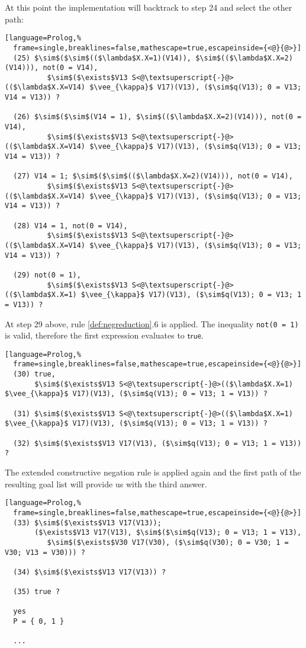 \documentclass[inscr,ack,preface]{dithesis}
\theoremstyle{definition}
\newcommand{\msf}[1]{$\mathsf{#1}$}
\begin{document}
At this point the implementation will backtrack to step 24 and select the other path:
\begin{lstlisting}[language=Prolog,%
  frame=single,breaklines=false,mathescape=true,escapeinside={<@}{@>}]
  (25) $\sim$($\sim$(($\lambda$X.X=1)(V14)), $\sim$(($\lambda$X.X=2)(V14))), not(0 = V14),
          $\sim$($\exists$V13 S<@\textsuperscript{-}@>(($\lambda$X.X=V14) $\vee_{\kappa}$ V17)(V13), ($\sim$q(V13); 0 = V13; V14 = V13)) ?

  (26) $\sim$($\sim$(V14 = 1), $\sim$(($\lambda$X.X=2)(V14))), not(0 = V14),
          $\sim$($\exists$V13 S<@\textsuperscript{-}@>(($\lambda$X.X=V14) $\vee_{\kappa}$ V17)(V13), ($\sim$q(V13); 0 = V13; V14 = V13)) ?

  (27) V14 = 1; $\sim$($\sim$(($\lambda$X.X=2)(V14))), not(0 = V14),
          $\sim$($\exists$V13 S<@\textsuperscript{-}@>(($\lambda$X.X=V14) $\vee_{\kappa}$ V17)(V13), ($\sim$q(V13); 0 = V13; V14 = V13)) ?

  (28) V14 = 1, not(0 = V14),
          $\sim$($\exists$V13 S<@\textsuperscript{-}@>(($\lambda$X.X=V14) $\vee_{\kappa}$ V17)(V13), ($\sim$q(V13); 0 = V13; V14 = V13)) ?

  (29) not(0 = 1),
          $\sim$($\exists$V13 S<@\textsuperscript{-}@>(($\lambda$X.X=1) $\vee_{\kappa}$ V17)(V13), ($\sim$q(V13); 0 = V13; 1 = V13)) ?
\end{lstlisting}

At step 29 above, rule \ref{def:negreduction}.6 is applied. The inequality \texttt{not(0 = 1)} is valid, therefore the first expression evaluates to \msf{true}.
\begin{lstlisting}[language=Prolog,%
  frame=single,breaklines=false,mathescape=true,escapeinside={<@}{@>}]
  (30) true,
       $\sim$($\exists$V13 S<@\textsuperscript{-}@>(($\lambda$X.X=1) $\vee_{\kappa}$ V17)(V13), ($\sim$q(V13); 0 = V13; 1 = V13)) ?

  (31) $\sim$($\exists$V13 S<@\textsuperscript{-}@>(($\lambda$X.X=1) $\vee_{\kappa}$ V17)(V13), ($\sim$q(V13); 0 = V13; 1 = V13)) ?

  (32) $\sim$($\exists$V13 V17(V13), ($\sim$q(V13); 0 = V13; 1 = V13)) ?
\end{lstlisting}

The extended constructive negation rule is applied again and the first path of the resulting goal list will provide us with the third answer.
\begin{lstlisting}[language=Prolog,%
  frame=single,breaklines=false,mathescape=true,escapeinside={<@}{@>}]
  (33) $\sim$($\exists$V13 V17(V13));
       ($\exists$V13 V17(V13), $\sim$($\sim$q(V13); 0 = V13; 1 = V13),
          $\sim$($\exists$V30 V17(V30), ($\sim$q(V30); 0 = V30; 1 = V30; V13 = V30))) ?

  (34) $\sim$($\exists$V13 V17(V13)) ?

  (35) true ?

  yes
  P = { 0, 1 }

  ...
\end{lstlisting}
\end{document}
